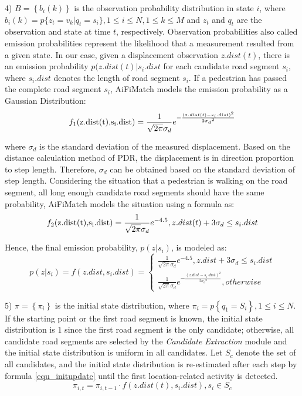 \documentclass{llncs}
\begin{document}
4) $B = \left\{ {{b_i}(k)} \right\}$ is the observation probability distribution in state $i$, where ${b_i}(k) = p\{ {z_t} = {v_k}|{q_t} = {s_i}\},1 \le i \le N,1 \le k \le M$ and $z_t$ and $q_t$ are the observation and state at time $t$, respectively. Observation probabilities also called emission probabilities represent the likelihood that a measurement resulted from a given state. In our case, given a displacement observation $z.dist(t)$, there is an emission probability $p(z.dist(t)|{s_i}.dist$ for each candidate road segment $s_i$, where ${s_i}.dist$ denotes the length of road segment $s_i$. If a pedestrian has passed the complete road segment $s_i$, AiFiMatch models the emission probability as a Gaussian Distribution:
\begin{equation}
\label{equ_emission1}
{f_1}({\rm{z}}{\rm{.dist(t),}}{{\rm{s}}_{\rm{i}}}{\rm{.dist}}) = \frac{1}{{\sqrt {2\pi } {\sigma _d}}}{e^{ - \frac{{{{(z.dist(t) - {s_i}.dist)}^2}}}{{2{\sigma _d}^2}}}}
\end{equation}

where $\sigma _d$ is the standard deviation of the measured displacement. Based on the distance calculation method of PDR, the displacement is in direction proportion to step length. Therefore, $\sigma _d$ can be obtained based on the standard deviation of step length. Considering the situation that a pedestrian is walking on the road segment, all long enough candidate road segments should have the same probability, AiFiMatch models the situation using a formula as:
\begin{equation}
{f_2}({\rm{z}}{\rm{.dist(t),}}{{\rm{s}}_{\rm{i}}}{\rm{.dist}}) = \frac{1}{{\sqrt {2\pi } {\sigma _d}}}{e^{-4.5}},z.dist(t) + 3{\sigma _d} \le {s_i}.dist
\end{equation}

Hence, the final emission probability, $p(z|s_i)$, is modeled as:
\begin{equation}
p(z|s_i)=f(z.dist,{s_i}.dist) = \left\{ {\begin{array}{*{20}{l}}
	{\frac{1}{{\sqrt {2\pi } {\sigma _d}}}{e^{-4.5}},z.dist + 3{\sigma _d} \le {s_i}.dist}\\
	{\frac{1}{{\sqrt {2\pi } {\sigma _d}}}{e^{ - \frac{{{{(z.dist - {s_i}.dist)}^2}}}{{2{\sigma _d}^2}}}},otherwise}
	\end{array}} \right.
\end{equation}

5) $\pi  = \left\{ {{\pi _i}} \right\}$ is the initial state distribution, where ${\pi _i} = p\left\{ {{q_1} = {S_i}} \right\},1 \le i \le N$. If the starting point or the first road segment is known, the initial state distribution is $1$ since the first road segment is the only candidate; otherwise, all candidate road segments are selected by the \emph{Candidate Extraction} module and the initial state distribution is uniform in all candidates. Let $S_c$ denote the set of all candidates, and the initial state distribution is re-estimated after each step by formula \ref{equ_initupdate} until the first location-related activity is detected.
\begin{equation}
\label{equ_initupdate}
{\pi _{i,t}} = {\pi _{i,t - 1}} \cdot f(z.dist(t),{s_i}.dist),{s_i} \in {S_c}
\end{equation}
\end{document}

